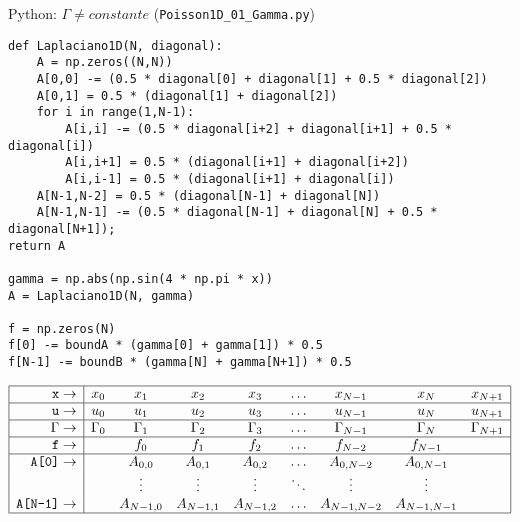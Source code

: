 \documentclass[handout]{beamer}
\begin{document}
\begin{frame}[fragile]{Python: $\Gamma \neq constante$ (\texttt{Poisson1D\_01\_Gamma.py})}

\begin{lstlisting}
def Laplaciano1D(N, diagonal):
    A = np.zeros((N,N))
    A[0,0] -= (0.5 * diagonal[0] + diagonal[1] + 0.5 * diagonal[2])
    A[0,1] = 0.5 * (diagonal[1] + diagonal[2])
    for i in range(1,N-1):
        A[i,i] -= (0.5 * diagonal[i+2] + diagonal[i+1] + 0.5 * diagonal[i])
        A[i,i+1] = 0.5 * (diagonal[i+1] + diagonal[i+2])
        A[i,i-1] = 0.5 * (diagonal[i+1] + diagonal[i])
    A[N-1,N-2] = 0.5 * (diagonal[N-1] + diagonal[N]) 
    A[N-1,N-1] -= (0.5 * diagonal[N-1] + diagonal[N] + 0.5 * diagonal[N+1]);
return A

gamma = np.abs(np.sin(4 * np.pi * x))
A = Laplaciano1D(N, gamma)

f = np.zeros(N)       
f[0] -= boundA * (gamma[0] + gamma[1]) * 0.5
f[N-1] -= boundB * (gamma[N] + gamma[N+1]) * 0.5
\end{lstlisting}

{\tiny
\[
\begin{array}{|r|cccccccc|}
\hline
\texttt{x} \rightarrow & x_0 & x_1 & x_2 & x_3 & \dots & x_{N-1} & x_N & x_{N+1}  \\
\hline 
\texttt{u} \rightarrow & u_0 & u_1 & u_2 & u_3 & \dots & u_{N-1} & u_N & u_{N+1}  \\
\hline
\Gamma \rightarrow & \Gamma_0 & \Gamma_1 & \Gamma_2 & \Gamma_3 & \dots & \Gamma_{N-1} & \Gamma_N & \Gamma_{N+1}  \\
\hline 
\texttt{f} \rightarrow &  & f_0 & f_1 & f_2 & \dots & f_{N-2} & f_{N-1} &     \\
\hline 
\texttt{A[0]} \rightarrow & & A_{0,0} & A_{0,1} & A_{0,2} & \dots & A_{0,N-2} &  A_{0,N-1} &\\
    & & \vdots & \vdots & \vdots & \ddots & \vdots & \vdots & \\
\texttt{A[N-1]} \rightarrow & & A_{N-1,0} & A_{N-1,1} & A_{N-1,2} & \dots & A_{N-1,N-2} &  A_{N-1,N-1} &\\
\hline
\end{array}
\]
}

\end{frame}
\end{document}
